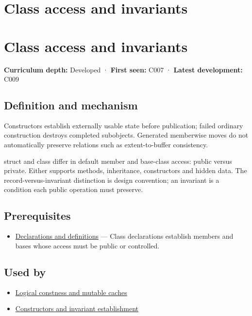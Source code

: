 \hypertarget{appendix-8e5214819615}{}
\section*{Class access and invariants}
\section{Class access and invariants}\label{class-access-and-invariants}

\textbf{Curriculum depth:} Developed · \textbf{First seen:} C007 · \textbf{Latest development:} C009

\subsection{Definition and mechanism}\label{definition-and-mechanism}

Constructors establish externally usable state before publication; failed ordinary construction destroys completed subobjects. Generated memberwise moves do not automatically preserve relations such as extent-to-buffer consistency.

struct and class differ in default member and base-class access: public versus private. Either supports methods, inheritance, constructors and hidden data. The record-versus-invariant distinction is design convention; an invariant is a condition each public operation must preserve.

\subsection{Prerequisites}\label{prerequisites}

\begin{itemize}
\tightlist
\item
  \hyperref[appendix-2e4d494c2d94]{Declarations and definitions} --- Class declarations establish members and bases whose access must be public or controlled.
\end{itemize}

\subsection{Used by}\label{used-by}

\begin{itemize}
\tightlist
\item
  \hyperref[appendix-f5593256bcaf]{Logical constness and mutable caches}
\item
  \hyperref[appendix-7f8ec83d0886]{Constructors and invariant establishment}
\end{itemize}

